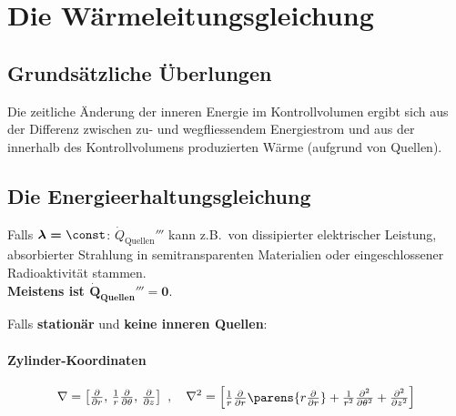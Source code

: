 
\section{Die Wärmeleitungsgleichung} %
	\subsection{Grundsätzliche Überlungen} %
		Die zeitliche Änderung der inneren Energie im Kontrollvolumen ergibt sich aus der
		Differenz zwischen zu- und wegfliessendem Energiestrom und aus der innerhalb des
		Kontrollvolumens produzierten Wärme (aufgrund von Quellen).
	\subsection{Die Energieerhaltungsgleichung} %
		
		Falls $\boldsymbol{\lambda = \const}$:
		$\dot Q_\text{Quellen}'''$ kann z.B.~von dissipierter elektrischer Leistung, absorbierter Strahlung in semitransparenten Materialien oder eingeschlossener Radioaktivität stammen. \\
		\textbf{Meistens ist $\boldsymbol{\dot Q_\text{Quellen}''' = 0}$}.
		
		Falls \textbf{stationär} und \textbf{keine inneren Quellen}:
		
		\paragraph{Zylinder-Koordinaten} %
			\[
				\nabla = \begin{bmatrix}
					\frac{\partial}{\partial r},\, \frac{1}{r} \frac{\partial}{\partial \theta},\, \frac{\partial}{\partial z}
				\end{bmatrix}
				\ , \quad
				\nabla^2 = \begin{bmatrix}
					\frac{1}{r}\frac{\partial}{\partial r}\parens{r \frac{\partial}{\partial r}}+\frac{1}{r^2} \frac{\partial^2}{\partial \theta^2} + \frac{\partial^2}{\partial z^2}
				\end{bmatrix}
			\]

